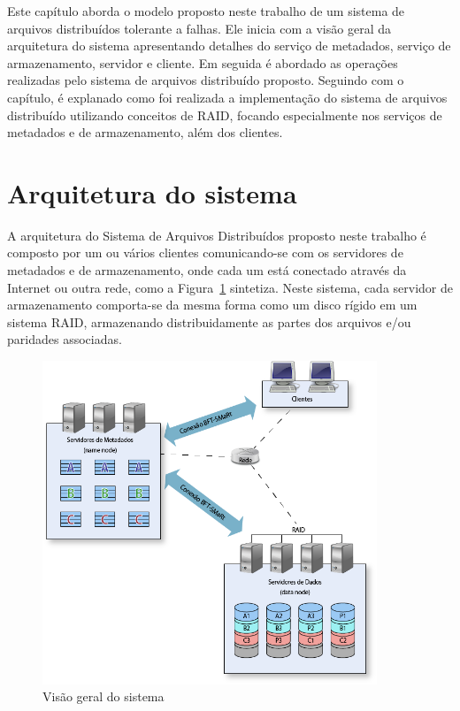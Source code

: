 Este capítulo aborda o modelo proposto neste trabalho de um sistema de arquivos distribuídos tolerante a falhas. Ele inicia com a visão geral da arquitetura do sistema apresentando detalhes do serviço de metadados, serviço de armazenamento, servidor e cliente. Em seguida é abordado as operações realizadas pelo sistema de arquivos distribuído proposto. Seguindo com o capítulo, é explanado como foi realizada a implementação do sistema de arquivos distribuído utilizando conceitos de RAID, focando especialmente nos serviços de metadados e de armazenamento, além dos clientes.


	\section{Arquitetura do sistema}
	
	A arquitetura do Sistema de Arquivos Distribuídos proposto neste trabalho é composto por um ou vários clientes comunicando-se com os servidores de metadados e de armazenamento, onde cada um está conectado através da Internet ou outra rede, como a Figura~\ref{fig:vis_sis} sintetiza. Neste sistema, cada servidor de armazenamento comporta-se da mesma forma como um disco rígido em um sistema RAID, armazenando distribuidamente as partes dos arquivos e/ou paridades associadas. \\
	
\begin{figure}[htb]
	\begin{center}
		
		\includegraphics[clip,width=10.0cm]{images/visao_geral.png}
		\caption{Visão geral do sistema}
		\label{fig:vis_sis}
	\end{center}
\end{figure}

